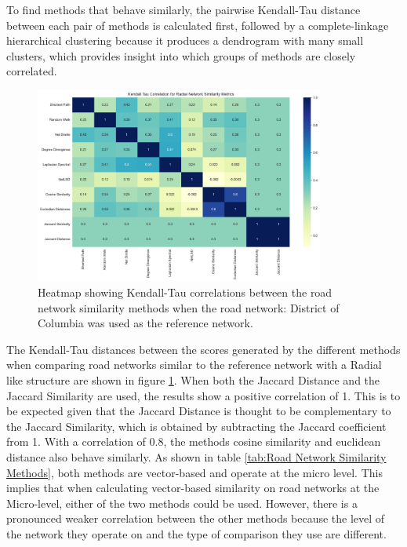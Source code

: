 To find methods that behave similarly, the pairwise Kendall-Tau distance between each pair of methods is calculated first, followed by a complete-linkage hierarchical clustering because it produces a dendrogram with many small clusters, which provides insight into which groups of methods are closely correlated.

\begin{figure}[!ht]
\centering
\includegraphics[width=0.85\textwidth,center]{picture/Radial/radial2.png}
\caption[Heatmap showing Kendall-Tau correlations between the road network similarity methods for Radial Road Networks]{Heatmap showing Kendall-Tau correlations between the road network similarity methods when the road network: District of Columbia was used as the reference network.}
\label{fig:network ranking radial}
\end{figure}

The Kendall-Tau distances between the scores generated by the different methods when comparing road networks similar to the reference network with a Radial like structure are shown in figure \ref{fig:network ranking radial}. When both the Jaccard Distance and the Jaccard Similarity are used, the results show a positive correlation of 1. This is to be expected given that the Jaccard Distance is thought to be complementary to the Jaccard Similarity, which is obtained by subtracting the Jaccard coefficient from 1. With a correlation of 0.8, the methods cosine similarity and euclidean distance also behave similarly. As shown in table \ref{tab:Road Network Similarity Methods}, both methods are vector-based and operate at the micro level. This implies that when calculating vector-based similarity on road networks at the Micro-level, either of the two methods could be used. However, there is a pronounced weaker correlation between the other methods because the level of the network they operate on and the type of comparison they use are different.

